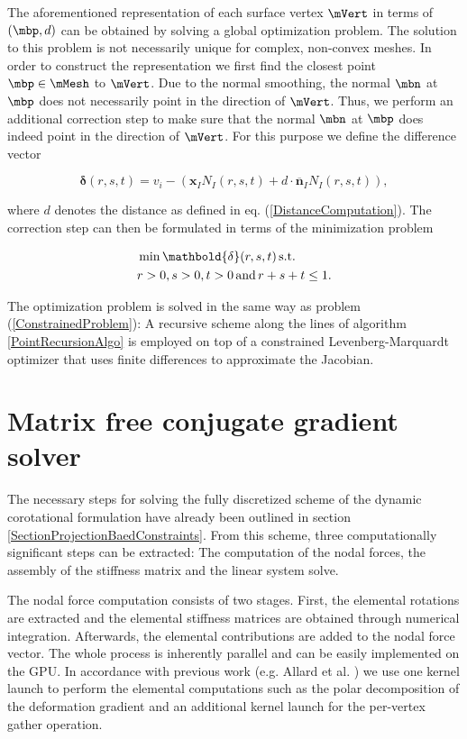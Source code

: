 The aforementioned representation of each surface vertex $\mVert$ in terms of $(\mbp, d)$ can be obtained by solving a global optimization problem. The solution to this problem is not necessarily unique for complex, non-convex meshes. In order to construct the representation we first find the closest point $\mbp \in \mMesh$ to $\mVert$. Due to the normal smoothing, the normal $\mbn$ at $\mbp$ does not necessarily point in the direction of $\mVert$. Thus, we perform an additional correction step to make sure that the normal $\mbn$ at $\mbp$ does indeed point in the direction of $\mVert$. For this purpose we define the difference vector

\begin{equation}
\mathbold{\delta}(r,s,t) =  v_i - ( \mathbf{x}_I N_I(r,s,t) + d \cdot \mathbf{\overline{n}}_I N_I(r,s,t) ),
\label{NormalCorrectionComputation}
\end{equation}

where $d$ denotes the distance as defined in eq. (\ref{DistanceComputation}). The correction step can then be formulated in terms of the minimization problem 

\begin{align}
	&\min \mathbold{\delta}(r,s,t) \, \textnormal{s.t.} \nonumber \\
	&r>0, s>0, t>0 \, \textnormal{and} \, r+s+t \leq 1.
	\label{CorrectionProblem}
\end{align}

The optimization problem is solved in the same way as problem (\ref{ConstrainedProblem}): A recursive scheme along the lines of algorithm \ref{PointRecursionAlgo} is employed on top of a constrained Levenberg-Marquardt optimizer that uses finite differences to approximate the Jacobian.


\section{Matrix free conjugate gradient solver}

The necessary steps for solving the fully discretized scheme of the dynamic corotational formulation have already been outlined in section \ref{SectionProjectionBaedConstraints}. From this scheme, three computationally significant steps can be extracted: The computation of the nodal forces, the assembly of the stiffness matrix and the linear system solve. 


The nodal force computation consists of two stages. First, the elemental rotations are extracted and the elemental stiffness matrices are obtained through numerical integration. Afterwards, the elemental contributions are added to the nodal force vector. The whole process is inherently parallel and can be easily implemented on the GPU. In accordance with previous work (e.g. Allard et al. \cite{Allard2011}) we use one kernel launch to perform the elemental computations such as the polar decomposition of the deformation gradient and an additional kernel launch for the per-vertex gather operation. 


